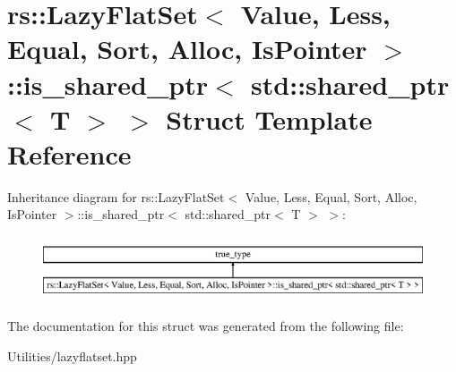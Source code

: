 \hypertarget{structrs_1_1_lazy_flat_set_1_1is__shared__ptr_3_01std_1_1shared__ptr_3_01_t_01_4_01_4}{\section{rs\+:\+:Lazy\+Flat\+Set$<$ Value, Less, Equal, Sort, Alloc, Is\+Pointer $>$\+:\+:is\+\_\+shared\+\_\+ptr$<$ std\+:\+:shared\+\_\+ptr$<$ T $>$ $>$ Struct Template Reference}
\label{structrs_1_1_lazy_flat_set_1_1is__shared__ptr_3_01std_1_1shared__ptr_3_01_t_01_4_01_4}
}
Inheritance diagram for rs\+:\+:Lazy\+Flat\+Set$<$ Value, Less, Equal, Sort, Alloc, Is\+Pointer $>$\+:\+:is\+\_\+shared\+\_\+ptr$<$ std\+:\+:shared\+\_\+ptr$<$ T $>$ $>$\+:\begin{figure}[H]
\begin{center}
\leavevmode
\includegraphics[height=1.917808cm]{structrs_1_1_lazy_flat_set_1_1is__shared__ptr_3_01std_1_1shared__ptr_3_01_t_01_4_01_4}
\end{center}
\end{figure}


The documentation for this struct was generated from the following file\+:\begin{DoxyCompactItemize}
\item 
Utilities/lazyflatset.\+hpp\end{DoxyCompactItemize}
